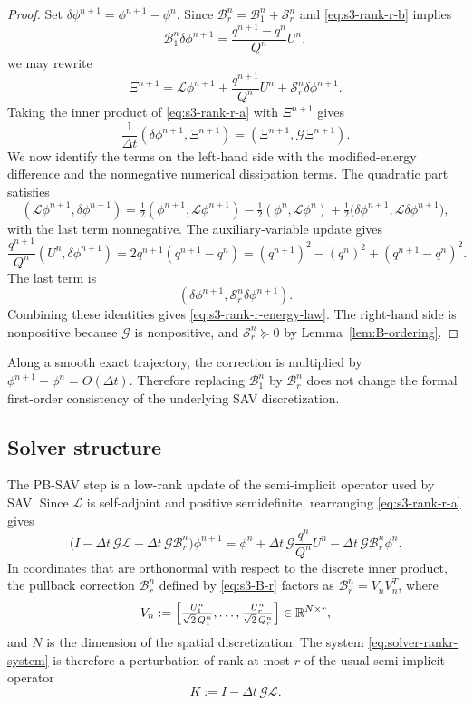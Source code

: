 \documentclass[10pt,onefignum,onetabnum,hidelinks]{siamart251216}
\begin{document}
\begin{proof}
Set $\delta\phi^{n+1}=\phi^{n+1}-\phi^n$.  Since $\mathcal B_r^n=\mathcal B_1^n+\mathcal S_r^n$ and
\eqref{eq:s3-rank-r-b} implies
\[
\mathcal B_1^n\delta\phi^{n+1}
=
\frac{q^{n+1}-q^n}{Q^n}U^n,
\]
we may rewrite
\[
\Xi^{n+1}
=
\mathcal L\phi^{n+1}
+
\frac{q^{n+1}}{Q^n}U^n
+
\mathcal S_r^n\delta\phi^{n+1}.
\]
Taking the inner product of \eqref{eq:s3-rank-r-a} with $\Xi^{n+1}$ gives
\[
\frac{1}{\Delta t}
\left(\delta\phi^{n+1},\Xi^{n+1}\right)
=
\left(\Xi^{n+1},\mathcal G\Xi^{n+1}\right).
\]
We now identify the terms on the left-hand side with the modified-energy difference and the nonnegative numerical dissipation terms.  The quadratic part satisfies
\[
\left(\mathcal L\phi^{n+1},\delta\phi^{n+1}\right)
=
\tfrac12(\phi^{n+1},\mathcal L\phi^{n+1})-\tfrac12(\phi^n,\mathcal L\phi^n)+\tfrac12\bigl(\delta\phi^{n+1},\mathcal L\delta\phi^{n+1}\bigr),
\]
with the last term nonnegative. The auxiliary-variable update gives
\[
\frac{q^{n+1}}{Q^n}
\left(U^n,\delta\phi^{n+1}\right)
=
2q^{n+1}(q^{n+1}-q^n)
=
(q^{n+1})^2-(q^n)^2+(q^{n+1}-q^n)^2.
\]
The last term is
\[
\left(
\delta\phi^{n+1},
\mathcal S_r^n\delta\phi^{n+1}
\right).
\]
Combining these identities gives \eqref{eq:s3-rank-r-energy-law}. The
right-hand side is nonpositive because $\mathcal G$ is nonpositive, and
$\mathcal S_r^n\succeq0$ by Lemma~\ref{lem:B-ordering}.
\end{proof}
\begin{remark}
Along a smooth exact trajectory, the correction is multiplied by $\phi^{n+1}-\phi^n=O(\Delta t)$.  Therefore replacing $\mathcal B_1^n$ by $\mathcal B_r^n$ does not change the formal first-order consistency of the underlying SAV discretization.
\end{remark}

\subsection{Solver structure}
\label{subsec:solver-structure}

The PB-SAV step is a low-rank update of the semi-implicit operator used by SAV.  Since $\mathcal L$ is self-adjoint and positive semidefinite, rearranging \eqref{eq:s3-rank-r-a} gives
\begin{equation}
\bigl(I-\Delta t\,\mathcal G\mathcal L-\Delta t\,\mathcal G\mathcal B_r^n\bigr)\phi^{n+1}
=
\phi^n+\Delta t\,\mathcal G\frac{q^n}{Q^n}U^n-\Delta t\,\mathcal G\mathcal B_r^n\phi^n.
\label{eq:solver-rankr-system}
\end{equation}
In coordinates that are orthonormal with respect to the discrete inner product, the pullback correction $\mathcal B_r^n$ defined by \eqref{eq:s3-B-r} factors as
\(\mathcal B_r^n=V_nV_n^T\), where
\[
V_n
:=
\Bigl[\tfrac{U_1^n}{\sqrt 2\,Q_1^n},\ldots,\tfrac{U_r^n}{\sqrt 2\,Q_r^n}\Bigr]
\in\mathbb R^{N\times r},
\]
and $N$ is the dimension of the spatial discretization. The system
\eqref{eq:solver-rankr-system} is therefore a perturbation of rank at most \(r\) of
the usual semi-implicit operator
\[
K:=I-\Delta t\,\mathcal G\mathcal L.
\]
\end{document}
